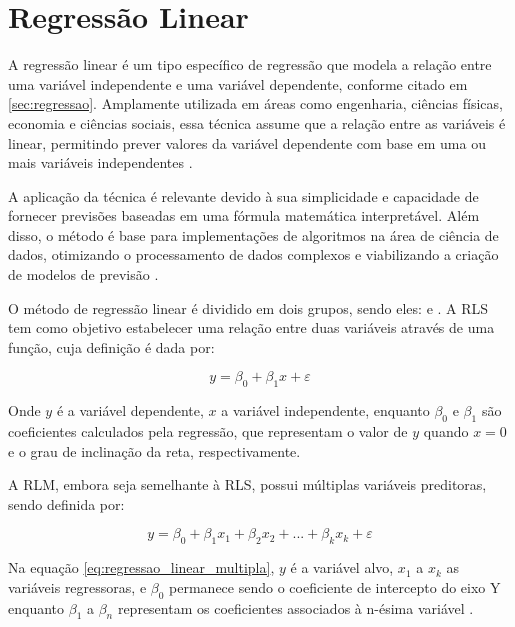\section{Regressão Linear}
\label{sec:regressao-linear}

A regressão linear é um tipo específico de regressão que modela a relação entre uma variável independente e uma variável dependente, conforme citado em \ref{sec:regressao}. Amplamente utilizada em áreas como engenharia, ciências físicas, economia e ciências sociais, essa técnica assume que a relação entre as variáveis é linear, permitindo prever valores da variável dependente com base em uma ou mais variáveis independentes \cite{montgomery2012}.

A aplicação da técnica é relevante devido à sua simplicidade e capacidade de fornecer previsões baseadas em uma fórmula matemática interpretável. Além disso, o método é base para implementações de algoritmos na área de ciência de dados, otimizando o processamento de dados complexos e viabilizando a criação de modelos de previsão \cite{aws2024}.

O método de regressão linear é dividido em dois grupos, sendo eles:  e  \cite{montgomery2012}. A RLS tem como objetivo estabelecer uma relação entre duas variáveis através de uma função, cuja definição é dada por:

\begin{equation}
	y = \beta_0 + \beta_1 x + \varepsilon
	\label{eq:regressao_linear_simples}
\end{equation}

Onde $y$ é a variável dependente, $x$ a variável independente, enquanto $\beta_0$ e $\beta_1$ são coeficientes calculados pela regressão, que representam o valor de $y$ quando $x=0$ e o grau de inclinação da reta, respectivamente.

A RLM, embora seja semelhante à RLS, possui múltiplas variáveis preditoras, sendo definida por:

\begin{equation}
	y = \beta_0 + \beta_1 x_{1} + \beta_2 x_{2} + ... + \beta_k x_{k} + \varepsilon
	\label{eq:regressao_linear_multipla}
\end{equation}

Na equação \ref{eq:regressao_linear_multipla}, $y$ é a variável alvo, $x_{1}$ a $x_{k}$ as variáveis regressoras, e $\beta_0$ permanece sendo o coeficiente de intercepto do eixo Y enquanto $\beta_1$ a $\beta_n$ representam os coeficientes associados à n-ésima variável \cite{sassi2012}.

